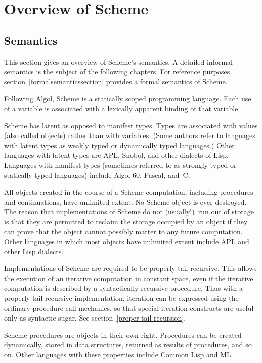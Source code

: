 
\chapter{Overview of Scheme}

\section{Semantics}
\label{semanticsection}

This section gives an overview of Scheme's semantics.  A
detailed informal semantics is the subject of
the following chapters.  For reference
purposes, section~\ref{formalsemanticssection} provides a formal
semantics of Scheme.

\vest Following Algol, Scheme is a statically scoped programming
language.  Each use of a variable is associated with a lexically
apparent binding of that variable.

\vest Scheme has latent as opposed to manifest types.  Types
are associated with values (also called objects) rather than
with variables.  (Some authors refer to languages with latent types as
weakly typed or dynamically typed languages.)  Other languages with
latent types are APL, Snobol, and other dialects of Lisp.  Languages
with manifest types (sometimes referred to as strongly typed or
statically typed languages) include Algol 60, Pascal, and~C.

\vest All objects created in the course of a Scheme computation, including
procedures and continuations, have unlimited extent.
No Scheme object is ever destroyed.  The reason that
implementations of Scheme do not (usually!)\ run out of storage is that
they are permitted to reclaim the storage occupied by an object if
they can prove that the object cannot possibly matter to any future
computation.  Other languages in which most objects have unlimited
extent include APL and other Lisp dialects.

\vest Implementations of Scheme are required to be properly tail-recursive.
This allows the execution of an iterative computation in constant space,
even if the iterative computation is described by a syntactically
recursive procedure.  Thus with a properly tail-recursive implementation,
iteration can be expressed using the ordinary procedure-call
mechanics, so that special iteration constructs are useful only as
syntactic sugar.  See section~\ref{proper tail recursion}.

\vest Scheme procedures are objects in their own right.  Procedures can be
created dynamically, stored in data structures, returned as results of
procedures, and so on.  Other languages with these properties include
Common Lisp and ML. 

